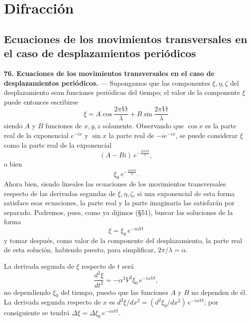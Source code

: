 \chapter{Difracción}
\label{cap:difraccion}

\section{Ecuaciones de los movimientos transversales en el caso de
desplazamientos periódicos}

\noindent\textbf{76. Ecuaciones de los movimientos transversales en el
caso de desplazamientos periódicos.} — Supongamos que las componentes
$\xi,\eta,\zeta$ del desplazamiento sean funciones periódicas del tiempo;
el valor de la componente $\xi$ puede entonces escribirse
\[
\xi = A\cos\frac{2\pi Vt}{\lambda} + B\sin\frac{2\pi Vt}{\lambda}
\]
siendo $A$ y $B$ funciones de $x,y,z$ solamente. Observando que $\cos x$
es la parte real de la exponencial $e^{-ix}$ y $\sin x$ la parte real de
$-ie^{-ix}$, se puede considerar $\xi$ como la parte real de la
exponencial
\[
(A-Bi)\,e^{-\frac{2i\pi Vt}{\lambda}},
\]
o bien
\[
\xi_0\,e^{-\frac{2i\pi Vt}{\lambda}}.
\]
Ahora bien, siendo lineales las ecuaciones de los movimientos
transversales respecto de las derivadas segundas de $\xi,\eta,\zeta$, si
una exponencial de esta forma satisface esas ecuaciones, la parte real y
la parte imaginaria las satisfarán por separado. Podremos, pues, como ya
dijimos (§51), buscar las soluciones de la forma
\[
\xi = \xi_0\,e^{-i\alpha Vt}
\]
y tomar después, como valor de la componente del desplazamiento, la parte
real de esta solución, habiendo puesto, para simplificar, $2\pi/\lambda=\alpha$.

La derivada segunda de $\xi$ respecto de $t$ será
\[
\frac{d^2\xi}{dt^2} = -\alpha^2V^2\xi_0\,e^{-i\alpha Vt},
\]
no dependiendo $\xi_0$ del tiempo, puesto que las funciones $A$ y $B$ no
dependen de él. La derivada segunda respecto de $x$ es
$d^2\xi/dx^2 = (d^2\xi_0/dx^2)\,e^{-i\alpha Vt}$; por consiguiente se
tendrá $\Delta\xi = \Delta\xi_0\,e^{-i\alpha Vt}$.

